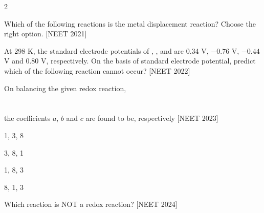 \documentclass[10pt,a4paper]{article}
\begin{document}
\begin{multicols}{2}
\begin{questions}[start=1]
\item Which of the following reactions is the metal displacement reaction? Choose the right option. \hfill [NEET 2021]
\begin{options}
  \item {}
  \item {}
  \item {}
  \item {}
\end{options}

\item At 298 K, the standard electrode potentials of , ,  and  are 0.34 V, $-0.76$ V, $-0.44$ V and 0.80 V, respectively. On the basis of standard electrode potential, predict which of the following reaction cannot occur? \hfill [NEET 2022]
\begin{options}
  \item {}
  \item {}
  \item {}
  \item {}
\end{options}

\item On balancing the given redox reaction,\\
\\
\\
the coefficients $a$, $b$ and $c$ are found to be, respectively \hfill [NEET 2023]
\begin{options}
  \item 1, 3, 8
  \item 3, 8, 1
  \item 1, 8, 3
  \item 8, 1, 3
\end{options}

\item Which reaction is NOT a redox reaction? \hfill [NEET 2024]
\begin{options}
  \item {}
  \item {}
  \item {}
  \item {}
\end{options}

\end{questions}
\end{multicols}
\end{document}
